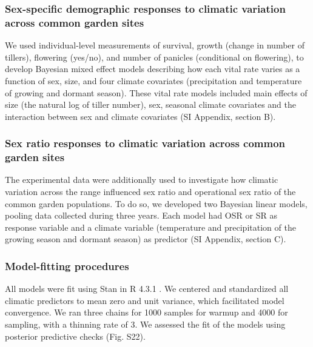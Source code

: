 \documentclass[9pt,twocolumn,twoside,lineno]{pnas-new}
\newcommand{\tom}[2]{{\color{red}{#1}}\footnote{\textit{\color{red}{#2}}}}
\begin{document}
\subsubsection*{Sex-specific demographic responses to climatic variation across common garden sites}
We used individual-level measurements of survival, growth (change in number of tillers), flowering (yes/no), and number of panicles (conditional on flowering), to develop Bayesian mixed effect models describing how each vital rate varies as a function of sex, size, and four climate covariates (precipitation and temperature of growing and dormant season). 
These vital rate models included main effects of size (the natural log of tiller number), sex, seasonal climate covariates and the interaction between sex and climate covariates (SI Appendix, section B). 

\subsubsection*{Sex ratio responses to climatic variation across common garden sites}
The experimental data were additionally used to investigate how climatic variation across the range influenced sex ratio and operational sex ratio of the common garden populations. 
To do so, we developed two Bayesian linear models, pooling data collected during three years.
Each model had OSR or SR as response variable and a climate variable (temperature and precipitation of the growing season and dormant season) as predictor (SI Appendix, section C). 


\subsubsection*{Model-fitting procedures}
All models were fit using Stan \citep{rstan} in R 4.3.1 \citep{RCoreteam}.
We centered and standardized all climatic predictors to mean zero and unit variance, which facilitated model convergence.
We ran three chains for 1000 samples for warmup and 4000 for sampling, with a thinning rate of 3.
We assessed the fit of the models using posterior predictive checks \citep{piironen2017comparison} (Fig. S22).
 
\end{document}
